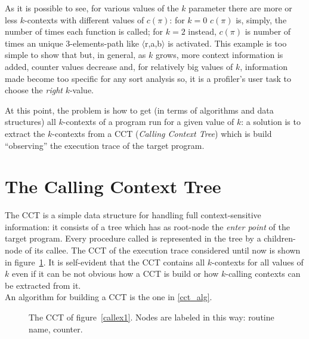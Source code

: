 \documentclass[a4paper,10pt]{report}
\begin{document}
As it is possible to see, for various values of the $k$ parameter there are more or less $k$-contexts with different values of $c(\pi)$: for $k=0$ $c(\pi)$ is, simply, the number of times each function is called; for $k=2$ instead, $c(\pi)$ is number of times an unique 3-elements-path like $\langle$r,a,b$\rangle$ is activated. This example is too simple to show that but, in general, as $k$ grows, more context information is added, counter values decrease and, for relatively big values of $k$, information made become too specific for any sort analysis so, it is a profiler's user task to choose the \emph{right} $k$-value.

At this point, the problem is how to get (in terms of algorithms and data
structures) all $k$-contexts of a program run for a given value of $k$: a solution is to extract the $k$-contexts from a CCT (\emph{Calling Context Tree}) which is build
``observing'' the execution trace of the target program.

\section{The Calling Context Tree}

The CCT is a simple data structure for handling full context-sensitive information:
it consists of a tree which has as root-node the \emph{enter point} of the target program.
Every procedure called is represented in the tree by a children-node of its callee.
The CCT of the execution trace considered until now is shown in figure~\ref{cct1}.
It is self-evident that the CCT contains all $k$-contexts for all values of $k$ even if
it can be not obvious how a CCT is build or how $k$-calling contexts can be extracted from it.\\
An algorithm for building a CCT is the one in \cref{cct_alg}.


\begin{figure}[H]

\begin{center}
\end{center}

\caption{The CCT of figure~\ref{callex1}. Nodes are labeled in this way: routine name, counter.}
\label{cct1}

\end{figure}
\end{document}
